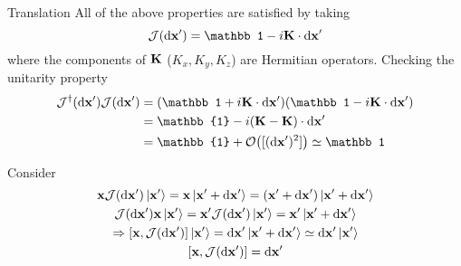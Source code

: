 \begin{frame}{Translation}
	All of the above properties are satisfied by taking
	\[
		\mathcal{J}(\dd{\vb x'}) = \mathbb 1 - i\vb{K} \cdot \dd{\vb x'}
	\]
	where the components of $\vb K$ ($K_x, K_y, K_z$) are Hermitian operators.
	Checking the unitarity property
	\begin{align*}
		\mathcal{J}^\dag(\dd{\vb x'}) \mathcal{J}(\dd{\vb x'}) & = (\mathbb 1 + i\vb K \cdot  \dd{\vb x'})(\mathbb 1 - i\vb K \cdot  \dd{\vb x'}) \\
		                                                       & = \mathbb{1} - i(\vb K - \vb K)\cdot \dd{\vb x'}                                 \\
		                                                       & = \mathbb{1} + \order{[(\dd{\vb x'})^2]} \simeq \mathbb 1
	\end{align*}

	Consider
	\begin{gather*}
		\vb x \mathcal{J}(\dd{\vb x'})\ket{\vb x'} = \vb x	\ket{\vb x' + \dd{\vb x'}} = (\vb x' + \dd{\vb x'})\ket{\vb x' + \dd{\vb x'}}\\
		\mathcal{J}(\dd{\vb x'}) \vb x \ket{\vb x'} = \vb x' \mathcal{J}(\dd{\vb x'}) \ket{\vb x'} = \vb x' \ket{\vb x' + \dd{\vb x'}}\\
		\Rightarrow \comm{\vb x}{\mathcal{J}(\dd{\vb x'})} \ket{\vb x'} = \dd{\vb x'} \ket{\vb x' + \dd{\vb x'}} \simeq \dd{\vb x'} \ket{\vb x'}\\
		\comm{\vb x}{\mathcal{J}(\dd{\vb x'})}  = \dd{\vb x'}
	\end{gather*}

\end{frame}


